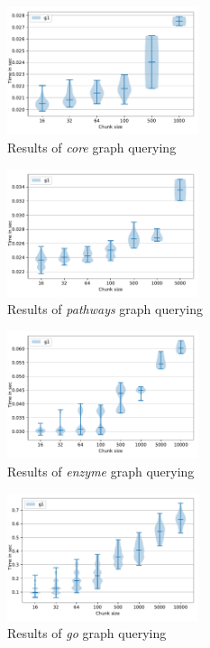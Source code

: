 \begin{figure}[h]
\centering
\includegraphics[width=0.5\textwidth]{data/raw_redis/core.pdf}
\caption{Results of \textit{core} graph querying}
\end{figure}


\begin{figure}[h]
\centering
\includegraphics[width=0.5\textwidth]{data/raw_redis/pathways.pdf}
\caption{Results of \textit{pathways} graph querying}
\end{figure}

\begin{figure}[h]
\centering
\includegraphics[width=0.5\textwidth]{data/raw_redis/enzyme.pdf}
\caption{Results of \textit{enzyme} graph querying}
\end{figure}


\begin{figure}[h]
\centering
\includegraphics[width=0.5\textwidth]{data/raw_redis/go.pdf}
\caption{Results of \textit{go} graph querying}
\end{figure}

